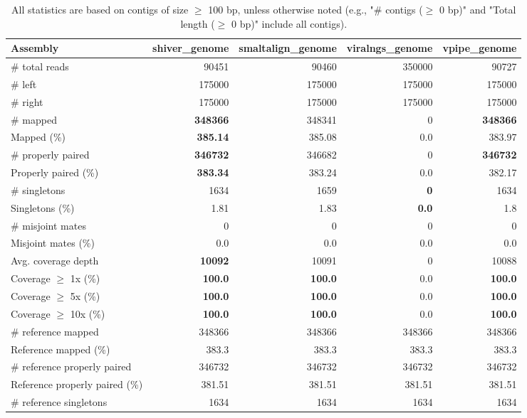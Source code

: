 \documentclass[12pt,a4paper]{article}
\begin{document}
\begin{table}[ht]
\begin{center}
\caption{All statistics are based on contigs of size $\geq$ 100 bp, unless otherwise noted (e.g., "\# contigs ($\geq$ 0 bp)" and "Total length ($\geq$ 0 bp)" include all contigs).}
\begin{tabular}{|l*{4}{|r}|}
\hline
Assembly & shiver\_genome & smaltalign\_genome & viralngs\_genome & vpipe\_genome \\ \hline
\# total reads & 90451 & 90460 & 350000 & 90727 \\ \hline
\# left & 175000 & 175000 & 175000 & 175000 \\ \hline
\# right & 175000 & 175000 & 175000 & 175000 \\ \hline
\# mapped & {\bf 348366} & 348341 & 0 & {\bf 348366} \\ \hline
Mapped (\%) & {\bf 385.14} & 385.08 & 0.0 & 383.97 \\ \hline
\# properly paired & {\bf 346732} & 346682 & 0 & {\bf 346732} \\ \hline
Properly paired (\%) & {\bf 383.34} & 383.24 & 0.0 & 382.17 \\ \hline
\# singletons & 1634 & 1659 & {\bf 0} & 1634 \\ \hline
Singletons (\%) & 1.81 & 1.83 & {\bf 0.0} & 1.8 \\ \hline
\# misjoint mates & 0 & 0 & 0 & 0 \\ \hline
Misjoint mates (\%) & 0.0 & 0.0 & 0.0 & 0.0 \\ \hline
Avg. coverage depth & {\bf 10092} & 10091 & 0 & 10088 \\ \hline
Coverage $\geq$ 1x (\%) & {\bf 100.0} & {\bf 100.0} & 0.0 & {\bf 100.0} \\ \hline
Coverage $\geq$ 5x (\%) & {\bf 100.0} & {\bf 100.0} & 0.0 & {\bf 100.0} \\ \hline
Coverage $\geq$ 10x (\%) & {\bf 100.0} & {\bf 100.0} & 0.0 & {\bf 100.0} \\ \hline
\# reference mapped & 348366 & 348366 & 348366 & 348366 \\ \hline
Reference mapped (\%) & 383.3 & 383.3 & 383.3 & 383.3 \\ \hline
\# reference properly paired & 346732 & 346732 & 346732 & 346732 \\ \hline
Reference properly paired (\%) & 381.51 & 381.51 & 381.51 & 381.51 \\ \hline
\# reference singletons & 1634 & 1634 & 1634 & 1634 \\ \hline

\end{tabular}
\end{center}
\end{table}
\end{document}
